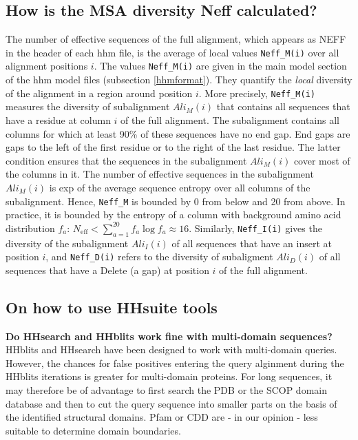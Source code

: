 \documentclass[11pt,a4paper]{article}
\begin{document}
\subsection{How is the MSA diversity Neff calculated?} \label{Neff}
The number of effective sequences of the full alignment, which appears as NEFF in the header of each hhm file, is the average of local values \verb`Neff_M(i)` over all alignment positions $i$. The values \verb`Neff_M(i)` are given in the main model section of the hhm model files (subsection \ref{hhmformat}). They quantify the \emph{local} diversity of the alignment in a region around position $i$. More precisely, \verb`Neff_M(i)` measures the diversity of subalignment $Ali_M(i)$ that contains all sequences that have a residue at column $i$ of the full alignment. The subalignment contains all columns for which at least 90\% of these sequences have no end gap. End gaps are gaps to the left of the first residue or to the right of the last residue. The latter condition ensures that the sequences in the subalignment $Ali_M(i)$ cover most of the columns in it. The number of effective sequences in the subalignment $Ali_M(i)$ is exp of the average sequence entropy over all columns of the subalignment. Hence, \verb`Neff_M` is bounded by 0 from below and 20 from above. In practice, it is bounded by the entropy of a column with background amino acid distribution $f_a$: $N_\mathrm{eff} < \sum_{a=1}^{20} f_a \log f_a \approx 16$. Similarly, \verb`Neff_I(i)` gives the diversity of the subalignment $Ali_I(i)$ of all sequences that have an insert at position $i$, and \verb`Neff_D(i)` refers to the diversity of subaligment $Ali_D(i)$ of all sequences that have a Delete (a gap) at position $i$ of the full alignment. 



\subsection{On how to use HHsuite tools}

{\bf Do HHsearch and HHblits work fine with multi-domain sequences?}
HHblits and HHsearch have been designed to work with multi-domain queries. However, the chances for false positives entering the query alginment during the HHblits iterations is greater for multi-domain proteins. For long sequences, it may therefore be of advantage to first search the PDB or the SCOP domain database and then to cut the query sequence into smaller parts on the basis of the identified structural domains. Pfam or CDD are - in our opinion - less suitable to determine domain boundaries.
\end{document}
